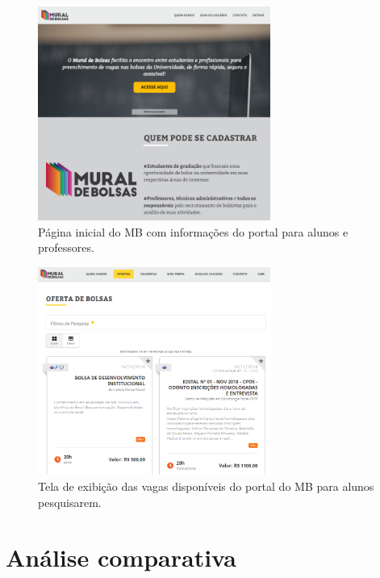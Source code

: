 \documentclass[cic,tc]{iiufrgs}
\begin{document}
\begin{figure}[h]
    \caption{Página inicial do MB com informações do portal para alunos e professores.}
        \begin{center}
            \includegraphics[width=0.68\textwidth]{figuras/rel06.png}
        \end{center}
    \label{telaHomeMB}
\end{figure}

\begin{figure}[h]
    \caption{Tela de exibição das vagas disponíveis do portal do MB para alunos pesquisarem.}
        \begin{center}
            \includegraphics[width=0.68\textwidth]{figuras/rel07.png}
        \end{center}
    \label{telaVagasMB}
\end{figure}

\section{Análise comparativa}
\label{trabRelAnalise}
\end{document}
